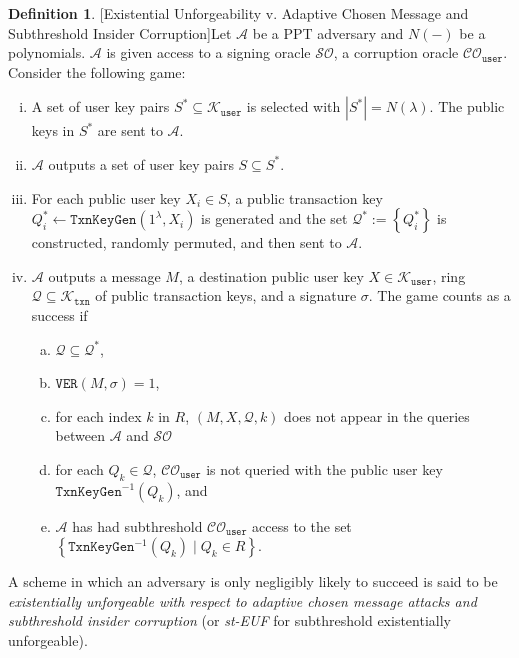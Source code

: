 \documentclass{mrl}
\theoremstyle{definition}
\newtheorem{defn}[theorem]{Definition}
\begin{document}
\begin{defn}{[Existential Unforgeability v. Adaptive Chosen Message and Subthreshold Insider Corruption]}\label{steuf} Let $\mathcal{A}$ be a PPT adversary and $N(-)$ be a polynomials. $\mathcal{A}$ is given access to a signing oracle $\mathcal{SO}$, a corruption oracle $\mathcal{CO}_{\texttt{user}}$. Consider the following game:

\begin{enumerate}[(i)]
\item A set of user key pairs $S^* \subseteq  \mathcal{K}_{\texttt{user}}$ is selected with $\left|S^*\right| = N(\lambda)$. The public keys in $S^*$ are sent to $\mathcal{A}$.
\item $\mathcal{A}$ outputs a set of user key pairs $S \subseteq S^*$.
\item For each public user key $X_i \in S$, a public transaction key $Q_i^* \leftarrow \texttt{TxnKeyGen}(1^\lambda, X_i)$ is generated and the set $\mathcal{Q}^* := \left\{Q_i^*\right\}$ is constructed, randomly permuted, and then sent to $\mathcal{A}$.
\item $\mathcal{A}$ outputs a message $M$, a destination public user key $X \in \mathcal{K}_{\texttt{user}}$, ring $\mathcal{Q} \subseteq \mathcal{K}_{\texttt{txn}}$ of public transaction keys, and a signature $\sigma$. The game counts as a success if 
\begin{enumerate}[(a)]
\item $\mathcal{Q} \subseteq \mathcal{Q}^*$,
\item $\texttt{VER}(M,\sigma)=1$,
\item for each index $k$ in $R$, $(M,X,\mathcal{Q},k)$ does not appear in the queries between $\mathcal{A}$ and $\mathcal{SO}$
\item for each $Q_k \in \mathcal{Q}$, $\mathcal{CO}_{\texttt{user}}$ is not queried with the public user key $\texttt{TxnKeyGen}^{-1}(Q_k)$, and
\item $\mathcal{A}$ has had subthreshold $\mathcal{CO}_{\texttt{user}}$ access to the set $\left\{\texttt{TxnKeyGen}^{-1}(Q_k) \mid Q_k \in R\right\}$.

\end{enumerate}
\end{enumerate}
A scheme in which an adversary is only negligibly likely to succeed is said to be \textit{existentially unforgeable with respect to adaptive chosen message attacks and subthreshold insider corruption} (or \textit{st-EUF} for subthreshold existentially unforgeable).
\end{defn}
\end{document}
